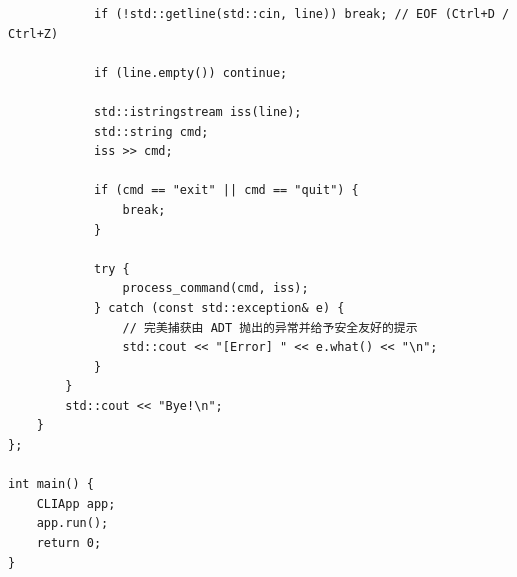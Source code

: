 \documentclass[supercite]{Experimental_Report}
\theoremstyle{definition}
\begin{document}
\begin{lstlisting}
			if (!std::getline(std::cin, line)) break; // EOF (Ctrl+D / Ctrl+Z)
			
			if (line.empty()) continue;
			
			std::istringstream iss(line);
			std::string cmd;
			iss >> cmd;
			
			if (cmd == "exit" || cmd == "quit") {
				break;
			}
			
			try {
				process_command(cmd, iss);
			} catch (const std::exception& e) {
				// 完美捕获由 ADT 抛出的异常并给予安全友好的提示
				std::cout << "[Error] " << e.what() << "\n";
			}
		}
		std::cout << "Bye!\n";
	}
};

int main() {
	CLIApp app;
	app.run();
	return 0;
}
\end{lstlisting}
\end{document}
